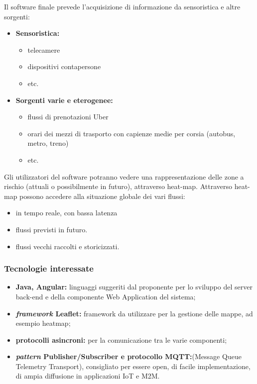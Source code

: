 \documentclass{article}
\begin{document}
Il software finale prevede l'acquisizione di informazione da sensoristica e altre sorgenti:
\begin{itemize}
	\item{\textbf{Sensoristica:}}
	    \begin{itemize}
	        \item telecamere
	        \item dispositivi contapersone
	        \item etc.
	    \end{itemize}
	\item{\textbf{Sorgenti varie e eterogenee:}}
	    \begin{itemize}
	        \item flussi di prenotazioni Uber
	        \item orari dei mezzi di trasporto con capienze medie per corsia (autobus, metro, treno)
	        \item etc.
	\end{itemize}
\end{itemize}
Gli utilizzatori del software potranno vedere una rappresentazione delle zone a rischio (attuali o possibilmente in futuro), attraverso heat-map.
Attraverso heat-map possono accedere alla situazione globale dei vari flussi:
\begin{itemize}
    \item in tempo reale, con bassa latenza
    \item flussi previsti in futuro.
    \item flussi vecchi raccolti e storicizzati.
\end{itemize}


\subsubsection{Tecnologie interessate}

\begin{itemize}
	\item{\textbf{Java, Angular:}} linguaggi suggeriti dal proponente per lo sviluppo del server back-end e della componente Web Application del sistema;
	\item{\textbf{\textit{framework} Leaflet:}} framework da utilizzare per la gestione delle mappe, ad esempio heatmap;
	\item{\textbf{protocolli asincroni:}} per la comunicazione tra le varie componenti;  
	\item{\textbf{\textit{pattern} Publisher/Subscriber e protocollo MQTT:}}\newline (Message Queue Telemetry Transport), consigliato per essere open, di facile implementazione, di ampia diffusione in applicazioni IoT e M2M.
\end{itemize}
\end{document}

